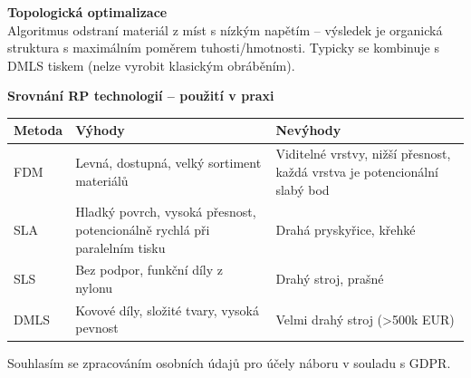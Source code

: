 \documentclass[a4paper,10pt]{article}
\begin{document}
\begin{vysvetlenibox}
\textbf{Topologická optimalizace}\\
Algoritmus odstraní materiál z míst s nízkým napětím -- výsledek
je organická struktura s maximálním poměrem tuhosti/hmotnosti.
Typicky se kombinuje s DMLS tiskem (nelze vyrobit klasickým obráběním).

\textbf{Srovnání RP technologií -- použití v praxi}

\begin{center}
\begin{tabularx}{0.95\linewidth}{@{} l X X @{}}
    \toprule
    \textbf{Metoda} & \textbf{Výhody} & \textbf{Nevýhody} \\
    \midrule
    FDM  & Levná, dostupná, velký sortiment materiálů
         & Viditelné vrstvy, nižší přesnost, každá vrstva je potencionální slabý bod \\
    SLA  & Hladký povrch, vysoká přesnost, potencionálně rychlá při paralelním tisku
         & Drahá pryskyřice, křehké \\
    SLS  & Bez podpor, funkční díly z nylonu
         & Drahý stroj, prašné \\
    DMLS & Kovové díly, složité tvary, vysoká pevnost
         & Velmi drahý stroj (\textgreater{}500k EUR) \\
    \bottomrule
\end{tabularx}
\end{center}
\end{vysvetlenibox}

\vfill
\noindent\textcolor{medgray}{\small
Souhlasím se zpracováním osobních údajů pro účely náboru v souladu s GDPR.}


\end{document}

